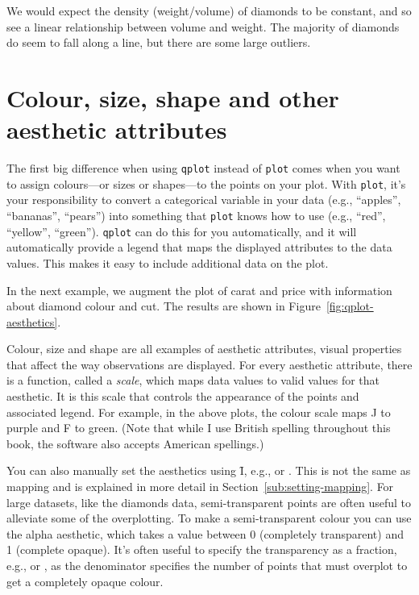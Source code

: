 % 


We would expect the density (weight/volume) of diamonds to be constant, and so see a linear relationship between volume and weight. The majority of diamonds do seem to fall along a line, but there are some large outliers.

\section{Colour, size, shape and other aesthetic attributes}
\label{sec:aesthetic_attributes}

The first big difference when using {\tt qplot} instead of {\tt plot} comes when you want to assign colours---or sizes or shapes---to the points on your plot.  With {\tt plot}, it's your responsibility to convert a categorical variable in your data (e.g., ``apples'', ``bananas'', ``pears'') into something that {\tt plot} knows how to use (e.g., ``red'', ``yellow'', ``green'').  {\tt qplot} can do this for you automatically, and it will automatically provide a legend that maps the displayed attributes to the data values.  This makes it easy to include additional data on the plot.  

In the next example, we augment the plot of carat and price with information about diamond colour and cut.  The results are shown in Figure~\ref{fig:qplot-aesthetics}.

% 


Colour, size and shape are all examples of aesthetic attributes, visual properties that affect the way observations are displayed. For every aesthetic attribute, there is a function, called a \emph{scale}, which maps data values to valid values for that aesthetic. It is this scale that controls the appearance of the points and associated legend. For example, in the above plots, the colour scale maps J to purple and F to green. (Note that while I use British spelling throughout this book, the software also accepts American spellings.)

You can also manually set the aesthetics using \f{I}, e.g.,  or .  This is not the same as mapping and is explained in more detail in Section~\ref{sub:setting-mapping}.  For large datasets, like the diamonds data, semi-transparent points are often useful to alleviate some of the overplotting.  To make a semi-transparent colour you can use the alpha aesthetic, which takes a value between 0 (completely transparent) and 1 (complete opaque).  It's often useful to specify the transparency as a fraction, e.g.,  or , as the denominator specifies the number of points that must overplot to get a completely opaque colour. 

